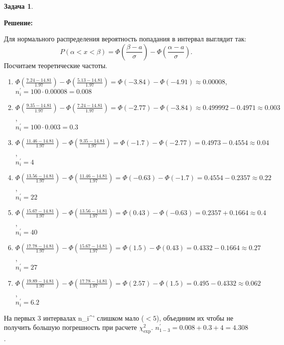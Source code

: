 \documentclass[a4paper,11pt]{article}
\newenvironment{shdd}{\begin{mdframed}[backgroundcolor=shadecolor]}{\end{mdframed}}
\theoremstyle{definition}
\newtheorem{problem}{Задача}\setlength{\parindent}{0pt}
\newenvironment{solution}
{\begin{shdd}
     \textbf{Решение:}\par\setlength{\parindent}{0pt}}
     {
\end{shdd}}
\begin{document}
\begin{problem}
\begin{solution}
            Для нормального распределения вероятность попадания в интервал выглядит так:
            \[
                P(\alpha < x < \beta) = \Phi(\frac{\beta - a}{\sigma}) - \Phi(\frac{\alpha - a}{\sigma}).
            \]
            Посчитаем теоретические частоты.
            \begin{enumerate}
                \item \(\Phi\left(\frac{7.24 - 14.81}{1.97}\right) - \Phi\left(\frac{5.13 - 14.81}{1.97}\right) = \Phi(-3.84) - \Phi(-4.91) \approx 0.00008 \), \\[1em]
                \(n_i^{'} = 100 \cdot 0.00008 = 0.008\)

                \item \(\Phi\left(\frac{9.35 - 14.81}{1.97}\right) - \Phi\left(\frac{7.24 - 14.81}{1.97}\right) = \Phi(-2.77) - \Phi(-3.84) \approx 0.499992 - 0.4971 \approx 0.003\), \\[1em]
                \(n_i^{'} = 100 \cdot 0.003 = 0.3\)

                \item \(\Phi\left(\frac{11.46 - 14.81}{1.97}\right) - \Phi\left(\frac{9.35 - 14.81}{1.97}\right) = \Phi(-1.7) - \Phi(-2.77) = 0.4973 - 0.4554 \approx 0.04\), \\[1em]
                \(n_i^{'} = 4\)

                \item \(\Phi\left(\frac{13.56 - 14.81}{1.97}\right) - \Phi\left(\frac{11.46 - 14.81}{1.97}\right) = \Phi(-0.63) - \Phi(-1.7) = 0.4554 - 0.2357 \approx 0.22\), \\[1em]
                \(n_i^{'} = 22\)

                \item \(\Phi\left(\frac{15.67 - 14.81}{1.97}\right) - \Phi\left(\frac{13.56 - 14.81}{1.97}\right) = \Phi(0.43) - \Phi(-0.63) = 0.2357 + 0.1664 \approx 0.4\), \\[1em]
                \(n_i^{'} = 40\)

                \item \(\Phi\left(\frac{17.78 - 14.81}{1.97}\right) - \Phi\left(\frac{15.67 - 14.81}{1.97}\right) = \Phi(1.5) - \Phi(0.43) = 0.4332 - 0.1664 \approx 0.27\), \\[1em]
                \(n_i^{'} = 27\)

                \item \(\Phi\left(\frac{19.89 - 14.81}{1.97}\right) - \Phi\left(\frac{17.78 - 14.81}{1.97}\right) = \Phi(2.57) - \Phi(1.5) = 0.495 - 0.4332 \approx 0.062\), \\[1em]
                \(n_i^{'} = 6.2 \)
            \end{enumerate}
            На первых 3 интервалах n_i^{'} слишком мало (\( < 5\)), объединим их чтобы не получить большую погрешность
            при расчете \(\chi^2_{\text{exp}}\). \(n_{1-3}^{'} = 0.008 + 0.3 + 4 = 4.308\).


\end{solution}
\end{problem}
\end{document}
